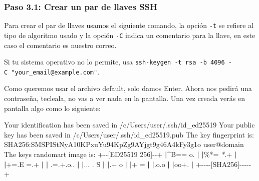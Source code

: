 \documentclass[
]{book}
\newenvironment{Shaded}{\begin{snugshade}}{\end{snugshade}}
\newcommand{\AttributeTok}[1]{\textcolor[rgb]{0.13,0.29,0.53}{#1}}
\newcommand{\BuiltInTok}[1]{#1}
\newcommand{\ExtensionTok}[1]{#1}
\newcommand{\KeywordTok}[1]{\textcolor[rgb]{0.13,0.29,0.53}{\textbf{#1}}}
\newcommand{\NormalTok}[1]{#1}
\newcommand{\PreprocessorTok}[1]{\textcolor[rgb]{0.56,0.35,0.01}{\textit{#1}}}
\newcommand{\StringTok}[1]{\textcolor[rgb]{0.31,0.60,0.02}{#1}}
\begin{document}
\hypertarget{paso-3.1-crear-un-par-de-llaves-ssh}{%
\subsubsection{Paso 3.1: Crear un par de llaves SSH}\label{paso-3.1-crear-un-par-de-llaves-ssh}}

Para crear el par de llaves usamos el siguiente comando, la opción \texttt{-t} se refiere al tipo de algoritmo usado y la opción \texttt{-C} indica un comentario para la llave, en este caso el comentario es nuestro correo.

\begin{Shaded}
\end{Shaded}

Si tu sistema operativo no lo permite, usa \texttt{ssh-keygen\ -t\ rsa\ -b\ 4096\ -C\ "your\_email@example.com"}.

Como queremos usar el archivo default, solo damos Enter. Ahora nos pedirá una contraseña, tecleala, no vas a ver nada en la pantalla. Una vez creada verás en pantalla algo como lo siguiente:

\begin{Shaded}
\begin{Highlighting}[]
\ExtensionTok{Your}\NormalTok{ identification has been saved in /c/Users/user/.ssh/id\_ed25519}
\ExtensionTok{Your}\NormalTok{ public key has been saved in /c/Users/user/.ssh/id\_ed25519.pub}
\ExtensionTok{The}\NormalTok{ key fingerprint is:}
\ExtensionTok{SHA256:SMSPIStNyA10KPxuYu94KpZg9AYjgt9g46A4kFy3g1o}\NormalTok{ user@domain}
\ExtensionTok{The}\NormalTok{ keys randomart image is:}
\ExtensionTok{+{-}{-}[ED25519}\NormalTok{ 256]{-}{-}+}
\KeywordTok{|}\ExtensionTok{\^{}B==}\NormalTok{ o.          }\KeywordTok{|}
\KeywordTok{|}\ExtensionTok{\%*=} \PreprocessorTok{*}\NormalTok{.+          }\KeywordTok{|}
\KeywordTok{|}\ExtensionTok{+=.E}\NormalTok{ =.+         }\KeywordTok{|}
\KeywordTok{|} \BuiltInTok{.}\NormalTok{=.+.o..        }\KeywordTok{|}
\KeywordTok{|}\ExtensionTok{...}\NormalTok{   . S        }\KeywordTok{|}
\KeywordTok{|}\BuiltInTok{.}\NormalTok{+ o             }\KeywordTok{|}
\KeywordTok{|}\ExtensionTok{+}\NormalTok{ =              }\KeywordTok{|}
\KeywordTok{|}\ExtensionTok{.o.o}             \KeywordTok{|}
\KeywordTok{|}\ExtensionTok{oo+.}             \KeywordTok{|}
\ExtensionTok{+{-}{-}{-}{-}[SHA256]{-}{-}{-}{-}{-}+}
\end{Highlighting}
\end{Shaded}
\end{document}
